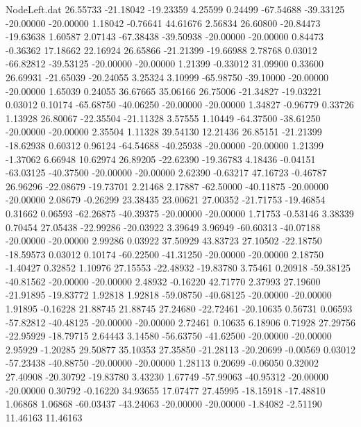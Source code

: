 \begin{filecontents}{NodeLeft.dat}
  26.55733  -21.18042  -19.23359     4.25599    0.24499  -67.54688  -39.33125  -20.00000  -20.00000    1.18042   -0.76641   44.61676    2.56834
  26.60800  -20.84473  -19.63638     1.60587    2.07143  -67.38438  -39.50938  -20.00000  -20.00000    0.84473   -0.36362   17.18662   22.16924
  26.65866  -21.21399  -19.66988     2.78768    0.03012  -66.82812  -39.53125  -20.00000  -20.00000    1.21399   -0.33012   31.09900    0.33600
  26.69931  -21.65039  -20.24055     3.25324    3.10999  -65.98750  -39.10000  -20.00000  -20.00000    1.65039    0.24055   36.67665   35.06166
  26.75006  -21.34827  -19.03221     0.03012    0.10174  -65.68750  -40.06250  -20.00000  -20.00000    1.34827   -0.96779    0.33726    1.13928
  26.80067  -22.35504  -21.11328     3.57555    1.10449  -64.37500  -38.61250  -20.00000  -20.00000    2.35504    1.11328   39.54130   12.21436
  26.85151  -21.21399  -18.62938     0.60312    0.96124  -64.54688  -40.25938  -20.00000  -20.00000    1.21399   -1.37062    6.66948   10.62974
  26.89205  -22.62390  -19.36783     4.18436   -0.04151  -63.03125  -40.37500  -20.00000  -20.00000    2.62390   -0.63217   47.16723   -0.46787
  26.96296  -22.08679  -19.73701     2.21468    2.17887  -62.50000  -40.11875  -20.00000  -20.00000    2.08679   -0.26299   23.38435   23.00621
  27.00352  -21.71753  -19.46854     0.31662    0.06593  -62.26875  -40.39375  -20.00000  -20.00000    1.71753   -0.53146    3.38339    0.70454
  27.05438  -22.99286  -20.03922     3.39649    3.96949  -60.60313  -40.07188  -20.00000  -20.00000    2.99286    0.03922   37.50929   43.83723
  27.10502  -22.18750  -18.59573     0.03012    0.10174  -60.22500  -41.31250  -20.00000  -20.00000    2.18750   -1.40427    0.32852    1.10976
  27.15553  -22.48932  -19.83780     3.75461    0.20918  -59.38125  -40.81562  -20.00000  -20.00000    2.48932   -0.16220   42.71770    2.37993
  27.19600  -21.91895  -19.83772     1.92818    1.92818  -59.08750  -40.68125  -20.00000  -20.00000    1.91895   -0.16228   21.88745   21.88745
  27.24680  -22.72461  -20.10635     0.56731    0.06593  -57.82812  -40.48125  -20.00000  -20.00000    2.72461    0.10635    6.18906    0.71928
  27.29756  -22.95929  -18.79715     2.64443    3.14580  -56.63750  -41.62500  -20.00000  -20.00000    2.95929   -1.20285   29.50877   35.10353
  27.35850  -21.28113  -20.20699    -0.00569    0.03012  -57.23438  -40.88750  -20.00000  -20.00000    1.28113    0.20699   -0.06050    0.32002
  27.40908  -20.30792  -19.83780     3.43230    1.67749  -57.99063  -40.95312  -20.00000  -20.00000    0.30792   -0.16220   34.93655   17.07477
  27.45995  -18.15918  -17.48810     1.06868    1.06868  -60.03437  -43.24063  -20.00000  -20.00000   -1.84082   -2.51190   11.46163   11.46163

\end{filecontents}
